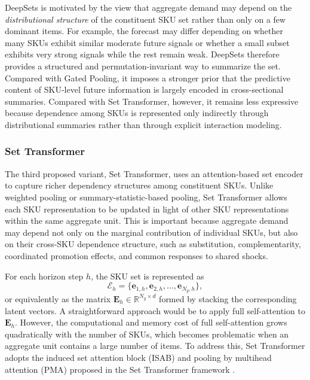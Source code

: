 \documentclass[12pt]{article}
\begin{document}
DeepSets is motivated by the view that aggregate demand may depend on the \emph{distributional structure} of the constituent SKU set rather than only on a few dominant items. For example, the forecast may differ depending on whether many SKUs exhibit similar moderate future signals or whether a small subset exhibits very strong signals while the rest remain weak. DeepSets therefore provides a structured and permutation-invariant way to summarize the set. Compared with Gated Pooling, it imposes a stronger prior that the predictive content of SKU-level future information is largely encoded in cross-sectional summaries. Compared with Set Transformer, however, it remains less expressive because dependence among SKUs is represented only indirectly through distributional summaries rather than through explicit interaction modeling.

\subsubsection{Set Transformer}
\label{subsec:tst}

The third proposed variant, Set Transformer, uses an attention-based set encoder \parencite{lee2019set} to capture richer dependency structures among constituent SKUs. Unlike weighted pooling or summary-statistic-based pooling, Set Transformer allows each SKU representation to be updated in light of other SKU representations within the same aggregate unit. This is important because aggregate demand may depend not only on the marginal contribution of individual SKUs, but also on their cross-SKU dependence structure, such as substitution, complementarity, coordinated promotion effects, and common responses to shared shocks.

For each horizon step $h$, the SKU set is represented as
\begin{equation}
  \mathcal{E}_h
  =
  \{\mathbf{e}_{1,h}, \mathbf{e}_{2,h}, \ldots, \mathbf{e}_{N_g,h}\},
\end{equation}
or equivalently as the matrix $\mathbf{E}_h \in \mathbb{R}^{N_g \times d}$ formed by stacking the corresponding latent vectors. A straightforward approach would be to apply full self-attention \parencite{vaswani2017attention} to $\mathbf{E}_h$. However, the computational and memory cost of full self-attention grows quadratically with the number of SKUs, which becomes problematic when an aggregate unit contains a large number of items. To address this, Set Transformer adopts the induced set attention block (ISAB) and pooling by multihead attention (PMA) proposed in the Set Transformer framework \parencite{lee2019set}.
\end{document}
